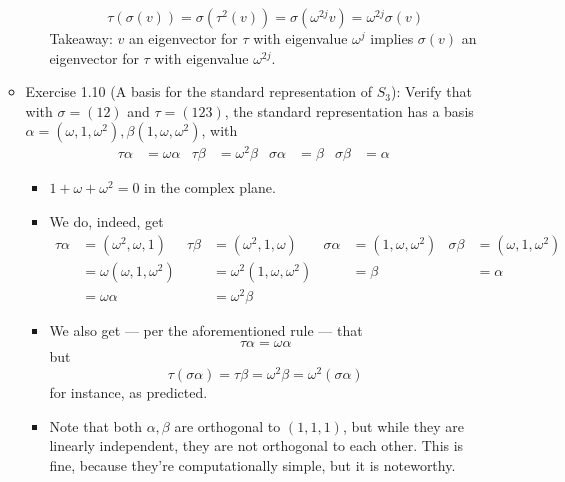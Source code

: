 \documentclass[../notes.tex]{subfiles}
\begin{document}
\begin{itemize}
\begin{itemize}
\begin{itemize}
            \begin{equation*}
                \tau(\sigma(v)) = \sigma(\tau^2(v))
                = \sigma(\omega^{2j}v)
                = \omega^{2j}\sigma(v)
            \end{equation*}
            Takeaway: $v$ an eigenvector for $\tau$ with eigenvalue $\omega^j$ implies $\sigma(v)$ an eigenvector for $\tau$ with eigenvalue $\omega^{2j}$.
        \end{itemize}
        \item Exercise 1.10 (A basis for the standard representation of $S_3$): Verify that with $\sigma=(12)$ and $\tau=(123)$, the standard representation has a basis $\alpha=(\omega,1,\omega^2),\beta(1,\omega,\omega^2)$, with
        \begin{align*}
            \tau\alpha &= \omega\alpha&
            \tau\beta &= \omega^2\beta&
            \sigma\alpha &= \beta&
            \sigma\beta &= \alpha
        \end{align*}
        \begin{itemize}
            \item $1+\omega+\omega^2=0$ in the complex plane.
            \item We do, indeed, get
            \begin{align*}
                \tau\alpha &= (\omega^2,\omega,1)&
                    \tau\beta &= (\omega^2,1,\omega)&
                        \sigma\alpha &= (1,\omega,\omega^2)&
                            \sigma\beta &= (\omega,1,\omega^2)\\
                &= \omega(\omega,1,\omega^2)&
                    &= \omega^2(1,\omega,\omega^2)&
                        &= \beta&
                            &= \alpha\\
                &= \omega\alpha&
                    &= \omega^2\beta
            \end{align*}
            \item We also get --- per the aforementioned rule --- that
            \begin{equation*}
                \tau\alpha = \omega\alpha
            \end{equation*}
            but
            \begin{equation*}
                \tau(\sigma\alpha) = \tau\beta = \omega^2\beta = \omega^2(\sigma\alpha)
            \end{equation*}
            for instance, as predicted.
            \item Note that both $\alpha,\beta$ are orthogonal to $(1,1,1)$, but while they are linearly independent, they are not orthogonal to each other. This is fine, because they're computationally simple, but it is noteworthy.

\end{itemize}
\end{itemize}
\end{itemize}
\end{document}
